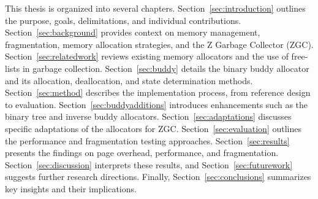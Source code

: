 This thesis is organized into several chapters. Section~\ref{sec:introduction} outlines the purpose, goals, delimitations, and individual contributions. Section~\ref{sec:background} provides context on memory management, fragmentation, memory allocation strategies, and the Z Garbage Collector (ZGC). Section~\ref{sec:relatedwork} reviews existing memory allocators and the use of free-lists in garbage collection. Section~\ref{sec:buddy} details the binary buddy allocator and its allocation, deallocation, and state determination methods. Section~\ref{sec:method} describes the implementation process, from reference design to evaluation. Section~\ref{sec:buddyadditions} introduces enhancements such as the binary tree and inverse buddy allocators. Section~\ref{sec:adaptations} discusses specific adaptations of the allocators for ZGC. Section~\ref{sec:evaluation} outlines the performance and fragmentation testing approaches. Section~\ref{sec:results} presents the findings on page overhead, performance, and fragmentation. Section~\ref{sec:discussion} interprets these results, and Section~\ref{sec:futurework} suggests further research directions. Finally, Section~\ref{sec:conclusions} summarizes key insights and their implications.